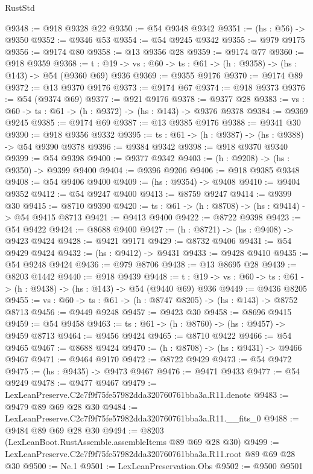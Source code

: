 \begin{lexlean}{RustStd}
\begin{coremodule}
@9348 := @918 @9328 @22
@9350 := @54 @9348 @9342
@9351 := (hs : @56) -> @9350
@9352 := @9346 @53
@9354 := @54 @9245 @9342
@9355 := @979 @9175
@9356 := @9174 @80
@9358 := @13 @9356 @28
@9359 := @9174 @77
@9360 := @918 @9359
@9368 := {t : @19} -> {vs : @60} -> {ts : @61} -> (h : @9358) -> (hs : @143) -> @54 (@9360 @69) @936
@9369 := @9355 @9176
@9370 := @9174 @89
@9372 := @13 @9370 @9176
@9373 := @9174 @67
@9374 := @918 @9373
@9376 := @54 (@9374 @69)
@9377 := @921 @9176
@9378 := @9377 @28
@9383 := {vs : @60} -> {ts : @61} -> (h : @9372) -> (hs : @143) -> @9376 @9378
@9384 := @9369 @9245
@9385 := @9174 @69
@9387 := @13 @9385 @9176
@9388 := @9341 @30
@9390 := @918 @9356 @9332
@9395 := {ts : @61} -> (h : @9387) -> (hs : @9388) -> @54 @9390 @9378
@9396 := @9384 @9342
@9398 := @918 @9370 @9340
@9399 := @54 @9398
@9400 := @9377 @9342
@9403 := (h : @9208) -> (hs : @9350) -> @9399 @9400
@9404 := @9396 @9206
@9406 := @918 @9385 @9348
@9408 := @54 @9406 @9400
@9409 := (hs : @9354) -> @9408
@9410 := @9404 @9352
@9412 := @54 @9247 @9400
@9413 := @8759 @9247
@9414 := @9399 @30
@9415 := @8710 @9390
@9420 := {ts : @61} -> (h : @8708) -> (hs : @9414) -> @54 @9415 @8713
@9421 := @9413 @9400
@9422 := @8722 @9398
@9423 := @54 @9422
@9424 := @8688 @9400
@9427 := (h : @8721) -> (hs : @9408) -> @9423 @9424
@9428 := @9421 @9171
@9429 := @8732 @9406
@9431 := @54 @9429 @9424
@9432 := (hs : @9412) -> @9431
@9433 := @9428 @9410
@9435 := @54 @9248 @9424
@9436 := @979 @8706
@9438 := @13 @8695 @28
@9439 := @8203 @1442
@9440 := @918 @9439
@9448 := {t : @19} -> {vs : @60} -> {ts : @61} -> (h : @9438) -> (hs : @143) -> @54 (@9440 @69) @936
@9449 := @9436 @8205
@9455 := {vs : @60} -> {ts : @61} -> (h : @8747 @8205) -> (hs : @143) -> @8752 @8713
@9456 := @9449 @9248
@9457 := @9423 @30
@9458 := @8696 @9415
@9459 := @54 @9458
@9463 := {ts : @61} -> (h : @8760) -> (hs : @9457) -> @9459 @8713
@9464 := @9456 @9424
@9465 := @8710 @9422
@9466 := @54 @9465
@9467 := @8688 @9424
@9470 := (h : @8708) -> (hs : @9431) -> @9466 @9467
@9471 := @9464 @9170
@9472 := @8722 @9429
@9473 := @54 @9472
@9475 := (hs : @9435) -> @9473 @9467
@9476 := @9471 @9433
@9477 := @54 @9249
@9478 := @9477 @9467
@9479 := LexLeanPreserve.C2c7f9f75fe57982dda320760761bba3a.R11.denote
@9483 := @9479 @89 @69 @28 @30
@9484 := LexLeanPreserve.C2c7f9f75fe57982dda320760761bba3a.R11.__fits_0
@9488 := @9484 @89 @69 @28 @30
@9494 := @8203 (LexLeanBoot.RustAssemble.assembleItems @89 @69 @28 @30)
@9499 := LexLeanPreserve.C2c7f9f75fe57982dda320760761bba3a.R11.root @89 @69 @28 @30
@9500 := Ne.{1}
@9501 := LexLeanPreservation.Obs
@9502 := @9500 @9501

\end{coremodule}
\end{lexlean}
